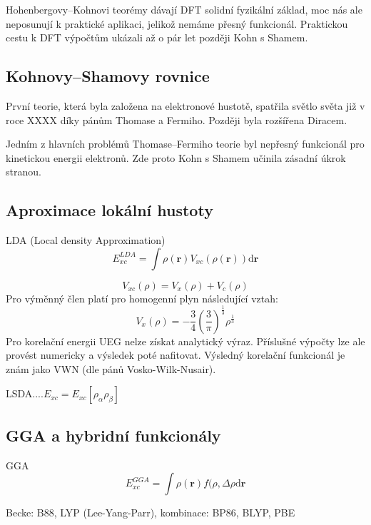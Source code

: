 Hohenbergovy--Kohnovi teorémy dávají DFT solidní fyzikální základ, moc nás ale neposunují k praktické aplikaci, jelikož nemáme přesný funkcionál.
Praktickou cestu k DFT výpočtům ukázali až o pár let později Kohn s Shamem.

\subsection{Kohnovy--Shamovy rovnice}
První teorie, která byla založena na elektronové hustotě, spatřila světlo světa již v roce XXXX díky pánům Thomase a Fermiho. Později byla rozšířena Diracem. 

Jedním z hlavních problémů Thomase--Fermiho teorie byl nepřesný funkcionál pro kinetickou energii elektronů. Zde proto Kohn s Shamem učinila zásadní úkrok stranou.   

\subsection{Aproximace lokální hustoty}

LDA (Local density Approximation)
\begin{equation}
E_{xc}^{LDA}=\int \rho(\textbf{r})V_{xc}(\rho(\textbf{r}))\mathrm{d}\textbf{r} 
\end{equation}


\begin{equation}
V_{xc}(\rho)=V_x(\rho)+V_c(\rho)
\end{equation}
Pro výměnný člen platí pro homogenní plyn následující vztah:
\begin{equation}
V_x(\rho)=-\frac{3}{4}\left(\frac{3}{\pi}\right)^{\frac{1}{3}}\rho^{\frac{1}{3}}
\end{equation}
Pro korelační energii UEG nelze získat analytický výraz. Příslušné výpočty lze ale provést numericky a výsledek poté nafitovat. Výsledný korelační funkcionál je znám jako VWN (dle pánů Vosko-Wilk-Nusair).

LSDA....$E_{xc}=E_{xc}[\rho_\alpha\rho_\beta]$ 


\subsection{GGA a hybridní funkcionály}
GGA 
\begin{equation}
E_{xc}^{GGA}=\int \rho(\textbf{r})f(\rho,\Delta\rho\mathrm{d}\textbf{r} 
\end{equation}

Becke: B88, LYP (Lee-Yang-Parr),
kombinace: BP86, BLYP, PBE

